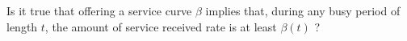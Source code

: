 \begin{problem}
Is it true that offering a service curve $\beta$ implies that,
during any busy period of length $t$, the amount of service
received rate is at least $\beta(t)$ ? 
\end{problem}

